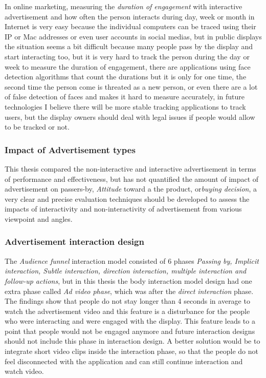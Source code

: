 In online marketing, measuring the \emph{duration of engagement} with interactive advertisement and how often the person interacts during day, week or month in Internet is very easy because the individual computers can be traced using their IP or Mac addresses or even user accounts in social medias, but in public displays the situation seems a bit difficult because many people pass by the display and start interacting too, but it is very hard to track the person during the day or week to measure the duration of engagement, there are applications \cite{glancingcount} using face detection algorithms that count the durations but it is only for one time, the second time the person come is threated as a new person, or even there are a lot of false detection of faces and makes it hard to measure accurately, in future technologies I believe there will be more stable tracking applications to track users, but the display owners should deal with legal issues if people would allow to be tracked or not. 

\subsubsection{Impact of Advertisement types}
This thesis compared the non-interactive and interactive advertisement in terms of performance and effectiveness, but has not quantified the amount of impact of advertisement on passers-by, \emph{Attitude} toward a the product, or\emph{buying decision}, a very clear and precise evaluation techniques should be developed to assess the impacts of interactivity and non-interactivity of advertisement from various viewpoint and angles.

\subsubsection{Advertisement interaction design}
The \emph{Audience funnel}\cite{AudienceFunnel} interaction model consisted of 6 phases \emph{Passing by, Implicit interaction, Subtle interaction, direction interaction, multiple interaction and follow-up actions}, but in this thesis the body interaction model design had one extra phase called \emph{Ad video phase}, which was after the \emph{direct interaction} phase. The findings show that people do not stay longer than 4 seconds in average to watch the advertisement video and this feature is a disturbance for the people who were interacting and were engaged with the display. This feature leads to a point that people would not be engaged anymore and future interaction designs should not include this phase in interaction design. A better solution would be to integrate short video clips inside the interaction phase, so that the people do not feel disconnected with the application and can still continue interaction and watch video.

